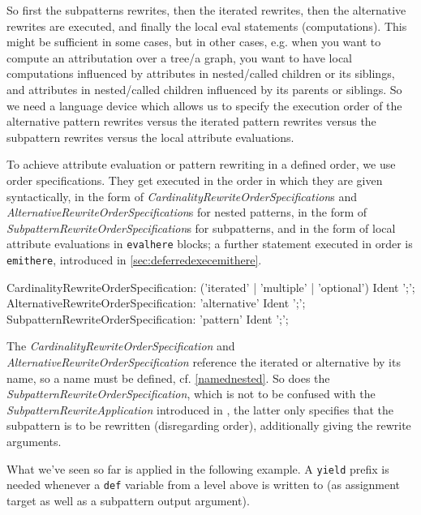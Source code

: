 So first the subpatterns rewrites, then the iterated rewrites, then the alternative rewrites are executed, and finally the local eval statements (computations).
This might be sufficient in some cases, but in other cases, e.g. when you want to compute an attributation over a tree/a graph, you want to have local computations influenced by attributes in nested/called children or its siblings, and attributes in nested/called children influenced by its parents or siblings.
So we need a language device which allows us to specify the execution order of the alternative pattern rewrites versus the iterated pattern rewrites versus the subpattern rewrites versus the local attribute evaluations.

To achieve attribute evaluation or pattern rewriting in a defined order, we use order specifications.
They get executed in the order in which they are given syntactically,
in the form of \emph{CardinalityRewriteOrderSpecification}s and \emph{AlternativeRewriteOrderSpecification}s for nested patterns,
in the form of \emph{SubpatternRewriteOrderSpecification}s for subpatterns,
and in the form of local attribute evaluations in \texttt{evalhere} blocks;
a further statement executed in order is \texttt{emithere}, introduced in \ref{sec:deferredexecemithere}. 

\begin{rail}  
  CardinalityRewriteOrderSpecification: 
    ('iterated' | 'multiple' | 'optional') Ident ';';
  AlternativeRewriteOrderSpecification: 
    'alternative' Ident ';';
  SubpatternRewriteOrderSpecification: 
    'pattern' Ident ';';
\end{rail}

The \emph{CardinalityRewriteOrderSpecification} and \emph{AlternativeRewriteOrderSpecification} reference the iterated or alternative by its name, so a name must be defined, cf. \ref{namednested}.
So does the \emph{SubpatternRewriteOrderSpecification}, which is not to be confused with the \emph{SubpatternRewriteApplication} introduced in \label{sec:subrule}, the latter only specifies that the subpattern is to be rewritten (disregarding order), additionally giving the rewrite arguments.

What we've seen so far is applied in the following example.
A \texttt{yield} prefix is needed whenever a \texttt{def} variable from a level above is written to (as assignment target as well as a subpattern output argument). 

